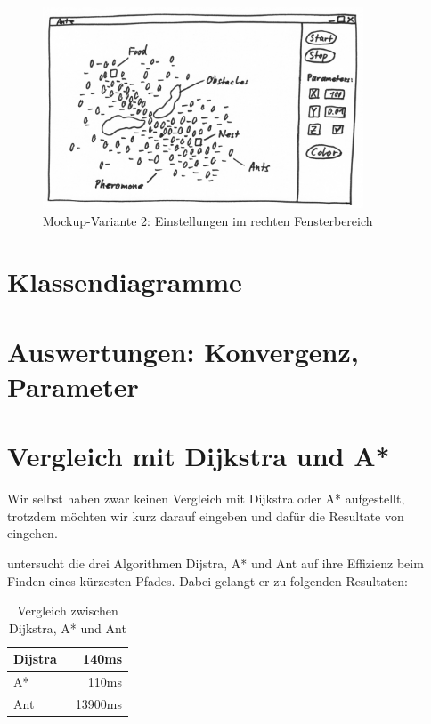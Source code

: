 \begin{figure}[h]
  \centering
	\includegraphics [width=0.85\textwidth]{images/Antz_Mockup_2_sw.png} 
	\caption{Mockup-Variante 2: Einstellungen im rechten Fensterbereich}
\end{figure}

\section{Klassendiagramme}

\section{Auswertungen: Konvergenz, Parameter}

\section{Vergleich mit Dijkstra und A*}

Wir selbst haben zwar keinen Vergleich mit Dijkstra oder A* aufgestellt, trotzdem möchten wir kurz darauf eingeben und dafür die Resultate von \citet*{leo-perf} eingehen.

\citeauthor*{leo-perf} untersucht die drei Algorithmen Dijstra, A* und Ant auf ihre Effizienz beim Finden eines kürzesten Pfades. Dabei gelangt er zu folgenden Resultaten:

\begin{table}[h]
\begin{tabular}{ | l | r | }
\hline
Dijstra & ~140ms \\
\hline
A* & ~110ms \\
\hline
Ant & ~13900ms \\
\hline
\end{tabular}
\caption{Vergleich zwischen Dijkstra, A* und Ant}
\end{table}

